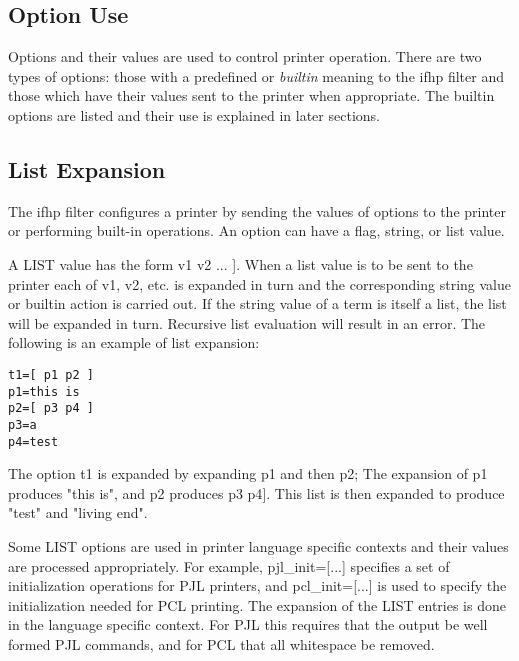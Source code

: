 \documentclass[a4paper]{article}
\begin{document}
\subsection{Option Use}

Options and their values are used to control printer operation.
There are two types of options:
those with a predefined or
{\itshape builtin\/}
meaning to the
{\ttfamily ifhp}
filter and those which
have their values sent to the printer when appropriate.
The builtin options are listed
and their use is explained
in later sections.


\subsection{List Expansion}

The
{\ttfamily ifhp}
filter configures a printer by sending the values of options to the printer
or performing built-in operations.
An option can have a flag, string, or list value.

A LIST value has the form {\ttfamily {[} v1 v2 ... {]}}.
When a list value is to be sent to the printer
each of {\ttfamily v1}, {\ttfamily v2}, etc. is expanded in turn
and the corresponding string value or builtin action is carried out.
If the string value of a term is itself a list,
the list will be expanded in turn.
Recursive list evaluation will result in an error.
The following is an example of list expansion:
\begin{tscreen}
\begin{verbatim}
t1=[ p1 p2 ]
p1=this is
p2=[ p3 p4 ]
p3=a
p4=test
\end{verbatim}
\end{tscreen}


The option {\ttfamily t1} is expanded by expanding {\ttfamily p1} and then {\ttfamily p2};
The expansion of {\ttfamily p1} produces
{\ttfamily "this is"},
and {\ttfamily p2} produces
{\ttfamily {[}p3 p4{]}}.
This list is then expanded to produce 
{\ttfamily "test"}
and
{\ttfamily "living end"}.

Some LIST options are used in
printer language specific contexts
and their values are processed appropriately.
For example,
pjl\_init={[}...{]} specifies a set of
initialization operations for PJL printers,
and pcl\_init={[}...{]} is used to specify the initialization
needed for PCL printing.
The expansion of the LIST entries is done in the language
specific context.
For PJL this requires that the output be well formed PJL commands,
and for PCL that all whitespace be removed.
\end{document}
